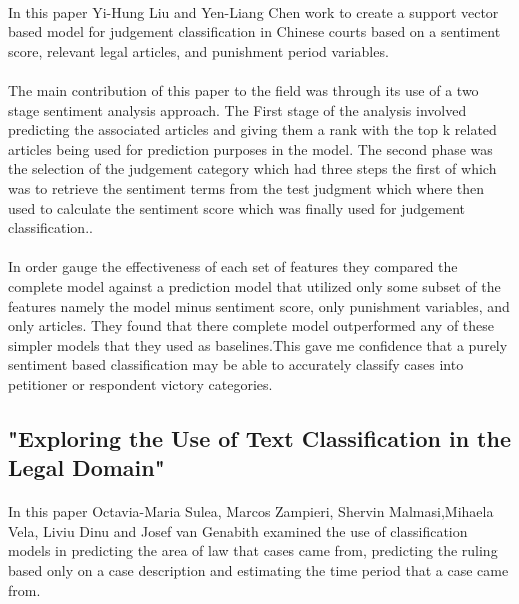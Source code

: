 \documentclass[12pt,english]{article}
\begin{document}
\paragraph{}
In this paper Yi-Hung Liu and Yen-Liang Chen work to create a support vector based model for judgement classification in Chinese courts based on a sentiment score, relevant legal articles, and punishment period variables.
\paragraph{}
The main contribution of this paper to the field was through its use of a two stage sentiment analysis approach. The First stage of the analysis involved predicting the associated articles and giving them a rank with the top k related articles being used for prediction purposes in the model. The second phase was the selection of the judgement category which had three steps the first of which was to retrieve the sentiment terms from the test judgment which where then used to calculate the sentiment score which was finally used for judgement classification.\citep{liu_two-phase_2018}.
\paragraph{}
In order gauge the effectiveness of each set of features they compared the complete model against a prediction model that utilized only some subset of the features namely the model minus sentiment score, only punishment variables, and only articles. They found that there complete model outperformed any of these simpler models that they used as baselines\citep{liu_two-phase_2018}.This gave me confidence that a purely sentiment based classification may be able to accurately classify cases into petitioner or respondent victory categories.
\paragraph{}
\subsection{"Exploring the Use of Text Classification in the Legal Domain"}
\paragraph{}
In this paper Octavia-Maria Sulea, Marcos Zampieri, Shervin Malmasi,Mihaela Vela, Liviu Dinu and Josef van Genabith examined the use of classification models in  predicting the area of law that cases came from, predicting the ruling based only on a case description and estimating the time period that a case came from\citep{sulea_exploring_2017}. 
\end{document}
